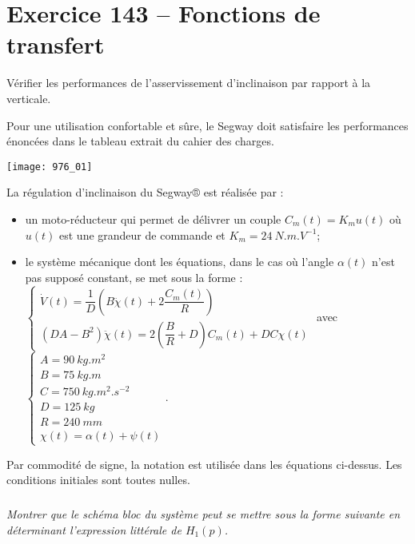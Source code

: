 \section*{Exercice 143 -- Fonctions de transfert}
\setcounter{exo}{0}


\begin{obj}
Vérifier les performances de l’asservissement d’inclinaison par rapport à la verticale.
\end{obj}

Pour une utilisation confortable et sûre, le Segway doit satisfaire les performances
énoncées dans le tableau extrait du cahier des charges.
\begin{center}
\texttt{[image: 976\_01]}%
\end{center}
La régulation d’inclinaison du Segway® est réalisée par :
\begin{itemize}
\item un moto-réducteur qui permet de délivrer un couple $C_m(t)=K_m u(t)$ où $u(t)$ est une grandeur de commande et $K_m=\SI{24}{N.m.V^{-1}}$;
\item le système mécanique dont les équations, dans le cas où l’angle $\alpha(t)$ n’est pas supposé constant, se met
sous la forme :
$\left\{
\begin{array}{l}
\dot{V}(t)=\dfrac{1}{D}\left( B\ddot{\chi}(t)+2\dfrac{C_m(t)}{R}\right) \\
\left(DA-B^2\right)\ddot{\chi}(t)=2\left(\dfrac{B}{R}+D\right)C_m(t)+DC\chi(t)
\end{array}
\right.
$ 
avec
$\left\{
\begin{array}{l}
A=\SI{90}{kg.m^2} \\
B=\SI{75}{kg.m} \\
C=\SI{750}{kg.m^2.s^{-2}} \\
D=\SI{125}{kg} \\
R=\SI{240}{mm} \\
\chi(t)=\alpha(t)+\psi(t) 
\end{array}
\right.
$.
\end{itemize}


Par commodité de signe, la notation est utilisée dans les équations ci-dessus. Les conditions initiales sont toutes nulles.


\subparagraph{}
\textit{Montrer que le schéma bloc du système peut se mettre sous la forme suivante en déterminant l’expression littérale de $H_1(p)$.}
\ifprof
\begin{corrige}
\end{corrige}
\else
\fi

